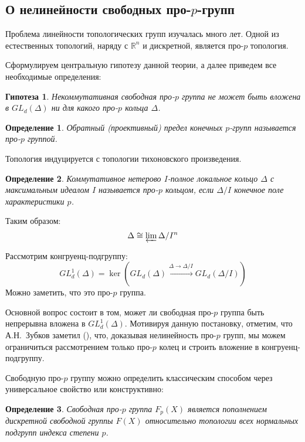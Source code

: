 \documentclass[12pt,a4paper]{article}
\newtheorem{definition}{Определение}[section]
\newtheorem{conjecture}{Гипотеза}[section]
\begin{document}
    \subsection{О нелинейности свободных про-$p$-групп}
    Проблема линейности топологических групп изучалась много лет.
    Одной из естественных топологий, наряду с $\mathbb{R}^n$ и дискретной, является про-$p$ топология.

    Сформулируем центральную гипотезу данной теории, а далее приведем все необходимые определения:

    \vskip 0.1in\noindent
    \begin{conjecture}
        Некоммутативная свободная про-$p$ группа не может быть вложена в $GL_d(\Delta)$ ни для какого про-$p$ кольца $\Delta$.
    \end{conjecture}
    \vskip 0.1in\noindent

    \vskip 0.1in\noindent
    \begin{definition}
        Обратный (проективный) предел конечных $p$-групп называется про-$p$ группой.
    \end{definition}
    \vskip 0.1in\noindent
    Топология индуцируется с топологии тихоновского произведения.

    \vskip 0.1in\noindent
    \begin{definition}
        Коммутативное нетерово $I$-полное локальное кольцо $\Delta$ с максимальным идеалом $I$ называется про-$p$ кольцом, если $\Delta/I$ конечное поле характеристики $p$.
    \end{definition}
    \vskip 0.1in\noindent

    Таким образом:
    \[
        \Delta \cong \varprojlim \Delta/I^n
    \]

    Рассмотрим конгруенц-подгруппу:
    \[
        GL_d^1(\Delta) = \ker\left( GL_d(\Delta) \xrightarrow{\Delta\to\Delta/I} GL_d(\Delta/I) \right)
    \]
    Можно заметить, что это про-$p$ группа.


    Основной вопрос состоит в том, может ли свободная про-$p$ группа быть непрерывна вложена в $GL_d^1(\Delta)$.
    Мотивируя данную постановку, отметим, что А.Н.\ Зубков заметил (\cite{Zubkov}), что, доказывая нелинейность про-$p$ групп, мы можем ограничиться рассмотрением только про-$p$ колец и строить вложение в конгруенц-подгруппу.

    Свободную про-$p$ группу можно определить классическим способом через универсальное свойство или конструктивно:

    \vskip 0.1in\noindent
    \begin{definition}
        Свободная про-$p$ группа $F_p(X)$ является пополнением дискретной свободной группы $F(X)$ относительно топологии всех нормальных подгрупп индекса степени $p$.
    \end{definition}
    \vskip 0.1in\noindent
\end{document}
